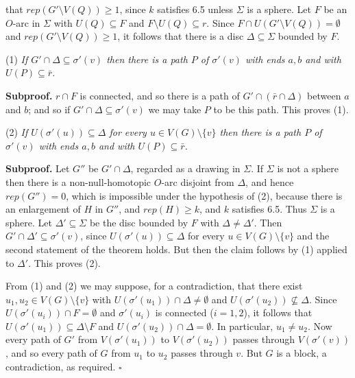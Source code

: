 \noindent that $rep(G'\setminus V(Q))\ge 1$, since $k$ satisfies 6.5 unless $\Sigma$ is a sphere. Let $F$ be an $O$-arc in $\Sigma$ with $U(Q)\subseteq F$ and $F\setminus U(Q)\subseteq r$. Since $F\cap U(G'\setminus V(Q)) = \emptyset$ and $rep(G'\setminus V(Q))\ge 1$, it follows that there is a disc $\Delta\subseteq \Sigma$ bounded by $F$.

\hspace*{12pt}(1) \textit{If $G'\cap \Delta\subseteq \sigma'(v)$ then there is a path $P$ of $\sigma'(v)$ with ends $a, b$ and with $U(P)\subseteq \bar{r}$.}

\textbf{Subproof.} $r\cap F$ is connected, and so there is a path of $G'\cap (\bar{r}\cap \Delta)$ between $a$ and $b$; and so if $G'\cap \Delta\subseteq \sigma'(v)$ we may take $P$ to be this path. This proves (1).

\hspace*{12pt}(2) \textit{If $U(\sigma'(u))\subseteq \Delta$ for every $u\in V(G)\setminus \{v\}$ then there is a path $P$ of $\sigma'(v)$ with ends $a, b$ and with $U(P)\subseteq \bar{r}$.}

\textbf{Subproof.} Let $G''$ be $G'\cap \Delta$, regarded as a drawing in $\Sigma$. If $\Sigma$ is not a sphere then there is a non-null-homotopic $O$-arc disjoint from $\Delta$, and hence $rep(G'') = 0$, which is impossible under the hypothesis of (2), because there is an enlargement of $H$ in $G''$, and $rep(H)\ge k$, and $k$ satisfies 6.5. Thus $\Sigma$ is a sphere. Let $\Delta'\subseteq \Sigma$ be the disc bounded by $F$ with $\Delta\ne \Delta'$. Then $G'\cap \Delta'\subseteq \sigma'(v)$, since $U(\sigma'(u))\subseteq \Delta$ for every $u\in V(G)\setminus \{v\}$ and the second statement of the theorem holds. But then the claim follows by (1) applied to $\Delta'$. This proves (2).

From (1) and (2) we may suppose, for a contradiction, that there exist $u_1, u_2\in V(G)\setminus \{v\}$ with $U(\sigma'(u_1))\cap \Delta\ne \emptyset$ and $U(\sigma'(u_2))\nsubseteq \Delta$. Since $U(\sigma'(u_i))\cap F = \emptyset$ and $\sigma'(u_i)$ is connected ($i = 1, 2$), it follows that $U(\sigma'(u_1))\subseteq \Delta\setminus F$ and $U(\sigma'(u_2))\cap \Delta = \emptyset$. In particular, $u_1\ne u_2$. Now every path of $G'$ from $V(\sigma'(u_1))$ to $V(\sigma'(u_2))$ passes through $V(\sigma'(v))$, and so every path of $G$ from $u_1$ to $u_2$ passes through $v$. But $G$ is a block, a contradiction, as required. $\square$

